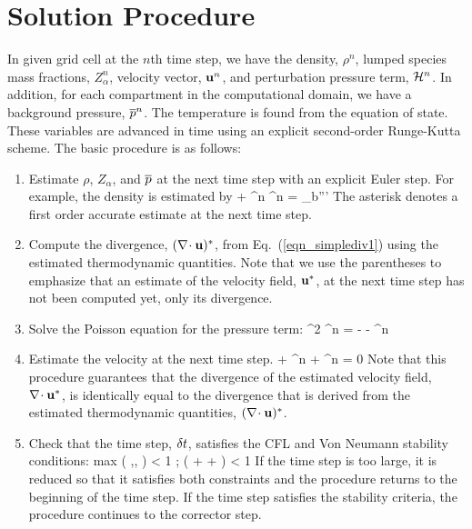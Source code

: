\section{Solution Procedure}

In given grid cell at the $n$th time step, we have the density, $\rho^n$, lumped species mass fractions, $Z_\alpha^n$, velocity
vector, ${\bf u}^n$, and perturbation pressure term, ${\cal H}^n$.
In addition, for each compartment in the computational domain, we have a background pressure, $\overline{p}^n$. The temperature is
found from the equation of state. These variables are advanced in time using an explicit second-order Runge-Kutta scheme.
The basic procedure is as follows:

\begin{enumerate}
\item Estimate $\rho$, $Z_\alpha$, and $\overline{p}$ at the next time step with an explicit Euler step. For
example, the density is estimated by
\be {} + \nabla\!\cdot \rho^n \bu^n = \dm_b''' \ee
The asterisk denotes a first order accurate estimate at the next time step.

\item Compute the divergence, $(\nabla\!\cdot {\bf u})^*$, from Eq.~(\ref{eqn_simplediv1}) using the estimated thermodynamic quantities.
Note that we use the parentheses to emphasize that an estimate of the
velocity field, ${\bf u}^*$, at the next time step has not been computed yet, only its divergence.

\item Solve the Poisson equation for the pressure term:
\be \nabla^2 \cH^n = -  - \nabla\!\cdot \bF^n  \ee

\item Estimate the velocity at the next time step.
\be
{} +  \bF^n + ^n = 0
\ee
Note that this procedure guarantees that the divergence of the estimated velocity field, $\nabla\!\cdot {\bf u}^*$, is identically
equal to the divergence that
is derived from the estimated thermodynamic quantities, $(\nabla\!\cdot {\bf u})^*$.

\item Check that the time step, $\delta t$, satisfies the CFL and Von Neumann stability conditions:
\be \dt \; \hbox{max} \left( ,, \right) < 1 \quad ;  \; \dt \; \nu \; \left( +  +  \right) < 1 \ee
If the time step is too large, it is reduced so that it satisfies
both constraints and the procedure returns to the beginning of the time step.
If the time step satisfies the stability criteria, the procedure continues to the corrector step.
\end{enumerate}

